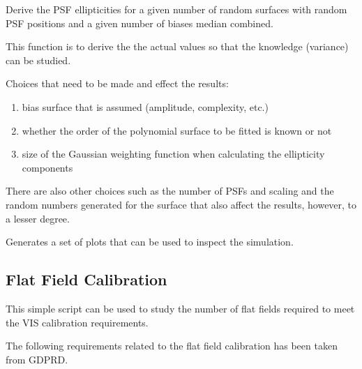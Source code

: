 \documentclass[a4paper,11pt,english]{sphinxmanual}
\begin{document}
\begin{fulllineitems}
\label{reduction:analysis.biasCalibration.testBiasCalibrationSigma}
Derive the PSF ellipticities for a given number of random surfaces with random PSF positions
and a given number of biases median combined.

This function is to derive the the actual values so that the knowledge (variance) can be studied.

Choices that need to be made and effect the results:
\begin{enumerate}
\item {} 
bias surface that is assumed (amplitude, complexity, etc.)

\item {} 
whether the order of the polynomial surface to be fitted is known or not

\item {} 
size of the Gaussian weighting function when calculating the ellipticity components

\end{enumerate}

There are also other choices such as the number of PSFs and scaling and the random numbers generated for
the surface that also affect the results, however, to a lesser degree.

Generates a set of plots that can be used to inspect the simulation.

\end{fulllineitems}

\label{reduction:module-analysis.FlatfieldCalibration}

\subsection{Flat Field Calibration}
\label{reduction:flat-field-calibration}
This simple script can be used to study the number of flat fields required to meet the VIS calibration requirements.

The following requirements related to the flat field calibration has been taken from GDPRD.
\end{document}
